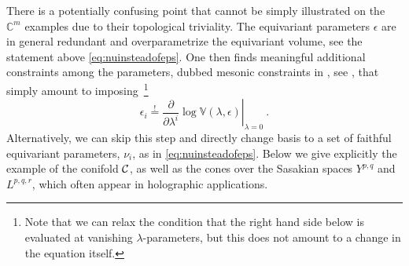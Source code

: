 \documentclass[11pt,a4paper]{article}
\def\cC{{\cal C}}
\theoremstyle{definition}
\theoremstyle{identity}
\theoremstyle{remark}
\newcommand{\be}{\begin{equation}}
\newcommand{\ee}{\end{equation}}
\newcommand{\e}{\epsilon}
\newcommand{\lam}{\lambda}
\newcommand{\BV}{\mathbb{V}}
\newcommand{\BC}{\mathbb{C}}
\begin{document}
There is a potentially confusing point that cannot be simply illustrated on the $\BC^m$ examples due to their topological triviality. The equivariant parameters $\e$ are in general redundant and overparametrize the equivariant volume, see the statement above \eqref{eq:nuinsteadofeps}. One then finds meaningful additional constraints among the parameters, dubbed mesonic constraints in \cite{Cassia:2025aus}, see \cite{Hosseini:2019use,Hosseini:2019ddy}, that simply amount to imposing~\footnote{Note that we can relax the condition that the right hand side below is evaluated at vanishing $\lam$-parameters, but this does not amount to a change in the equation itself.}
\be
\label{eq:mesonicconstraint}
 \e_i \stackrel{!}{=}
 \left.\frac{\partial}{\partial\lam^i}\log\BV(\lam,\e)\right|_{\lam=0}\ .
\ee
Alternatively, we can skip this step and directly change basis to a set of faithful equivariant parameters, $\nu_i$, as in \eqref{eq:nuinsteadofeps}. Below we give explicitly the example of the conifold $\cC$, as well as the cones over the Sasakian spaces $Y^{p,q}$ and $L^{p,q,r}$, which often appear in holographic applications.
\end{document}

